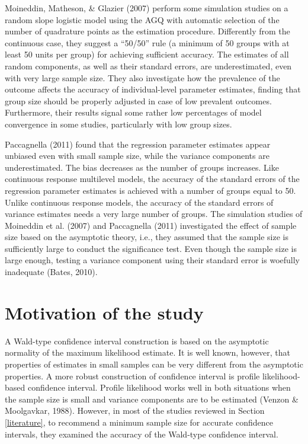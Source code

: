 \documentclass[12pt,oneside,a4paper]{reedthesis}
\begin{document}
Moineddin, Matheson, \& Glazier (2007) perform some simulation studies on a random slope logistic model using the AGQ with automatic selection of the number of quadrature points as the estimation procedure. Differently from the continuous case, they suggest a ``50/50'' rule (a minimum of 50 groups with at least 50 units per group) for achieving sufficient accuracy. The estimates of all random components, as well as their standard errors, are underestimated, even with very large sample size. They also investigate how the prevalence of the outcome affects the accuracy of individual-level parameter estimates, finding that group size should be properly adjusted in case of low prevalent outcomes. Furthermore, their results signal some rather low percentages of model convergence in some studies, particularly with low group sizes.

Paccagnella (2011) found that the regression parameter estimates appear unbiased even with small sample size, while the variance components are underestimated. The bias decreases as the number of groups increases. Like continuous response multilevel models, the accuracy of the standard errors of the regression parameter estimates is achieved with a number of groups equal to 50. Unlike continuous response models, the accuracy of the standard errors of variance estimates needs a very large number of groups.
The simulation studies of Moineddin et al. (2007) and Paccagnella (2011) investigated the effect of sample size based on the asymptotic theory, i.e., they assumed that the sample size is sufficiently large to conduct the significance test. Even though the sample size is large enough, testing a variance component using their standard error is woefully inadequate (Bates, 2010).

\hypertarget{motivation-of-the-study}{%
\section{Motivation of the study}\label{motivation-of-the-study}}

A Wald-type confidence interval construction is based on the asymptotic normality of the maximum likelihood estimate. It is well known, however, that properties of estimates in small samples can be very different from the asymptotic properties. A more robust construction of confidence interval is profile likelihood-based confidence interval. Profile likelihood works well in both situations when the sample size is small and variance components are to be estimated (Venzon \& Moolgavkar, 1988).
However, in most of the studies reviewed in Section \ref{literature}, to recommend a minimum sample size for accurate confidence intervals, they examined the accuracy of the Wald-type confidence interval.
\end{document}
